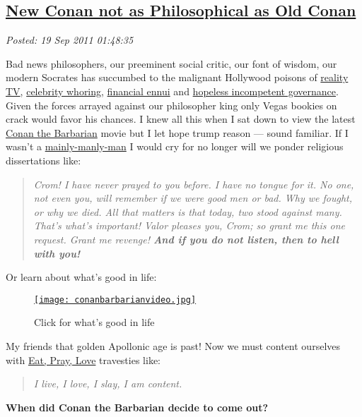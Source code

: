 %

\subsection*{\href{https://bakerjd99.wordpress.com/2011/09/18/new-conan-not-as-philosophical-as-old-conan/}{New Conan not as Philosophical as Old Conan}}


\noindent\emph{Posted: 19 Sep 2011 01:48:35}
\vspace{6pt}

Bad news philosophers, our preeminent social critic, our font of wisdom,
our modern Socrates has succumbed to the malignant Hollywood poisons of
\href{http://www.youjustmademylist.com/?p=562}{reality TV},
\href{http://www.spike.com/articles/0xugni/the-top-10-whore-rific-female-celebrities}{celebrity
whoring},
\href{http://www.bizjournals.com/seattle/blog/2011/09/scant-improvement-in-nations.html}{financial
ennui} and \href{http://www.whitehouse.gov/}{hopeless incompetent
governance}. Given the forces arrayed against our philosopher king only
Vegas bookies on crack would favor his chances. I knew all this when I
sat down to view the latest
\href{http://www.imdb.com/video/screenplay/vi3994852377/}{Conan the
Barbarian} movie but I let hope trump reason --- sound familiar. If I
wasn't a
\href{http://staff.rio.edu/miket/attitude.htm}{mainly-manly-man} I would
cry for no longer will we ponder religious dissertations like:

\begin{quotation}
\emph{Crom! I have never prayed to you before. I have no tongue for it.
No one, not even you, will remember if we were good men or bad. Why we
fought, or why we died. All that matters is that today, two stood
against many. That's what's important! Valor pleases you, Crom; so grant
me this one request. Grant me revenge! \textbf{And if you do not listen,
then to hell with you!}}
\end{quotation}

Or learn about what's good in life:

\captionsetup[figure]{labelformat=empty}
\begin{figure}[htbp]
\centering
\href{http://www.youtube.com/watch?v=6PQ6335puOc}{\texttt{[image: conanbarbarianvideo.jpg]}}
\caption{Click for what's good in life}
\label{fig:conanlife}
\end{figure}


My friends that golden Apollonic age is past! Now we must content
ourselves with
\href{http://bakerjd99.wordpress.com/2010/08/16/binge-pretend-boink/}{Eat,
Pray, Love} travesties like:

\begin{quotation}
\emph{I live, I love, I slay, I am content.}
\end{quotation}

\textbf{When did Conan the Barbarian decide to come out?}

%